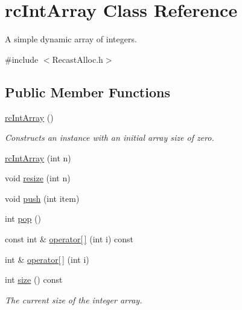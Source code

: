 \hypertarget{classrcIntArray}{}\section{rc\+Int\+Array Class Reference}
\label{classrcIntArray}


A simple dynamic array of integers.  




{\ttfamily \#include $<$Recast\+Alloc.\+h$>$}

\subsection*{Public Member Functions}
\begin{DoxyCompactItemize}
\item 
\mbox{\label{classrcIntArray_a7c2de9614c66762b3083becbdcaf07d4}} 
\hyperlink{classrcIntArray_a7c2de9614c66762b3083becbdcaf07d4}{rc\+Int\+Array} ()
\begin{DoxyCompactList}\small\item\em Constructs an instance with an initial array size of zero. \end{DoxyCompactList}\item 
\hyperlink{classrcIntArray_ae24aed0e0cb7e79fc0a34de088eba93a}{rc\+Int\+Array} (int n)
\item 
void \hyperlink{classrcIntArray_a2135fb43dd504939a2eadbb78650c155}{resize} (int n)
\item 
void \hyperlink{classrcIntArray_ae52f6cd7ffdd2dba00f6f006853dc441}{push} (int item)
\item 
int \hyperlink{classrcIntArray_a25558e84868988dc42bf5b2b3c9c3a84}{pop} ()
\item 
const int \& \hyperlink{classrcIntArray_a27c2d32c068dfe3021e0bc4efc2ca04c}{operator\mbox{[}$\,$\mbox{]}} (int i) const
\item 
int \& \hyperlink{classrcIntArray_a795c1a259ad8ddb6e2f5143fa721a89d}{operator\mbox{[}$\,$\mbox{]}} (int i)
\item 
\mbox{\label{classrcIntArray_af17b8fb439ac8121af044d4f4d13753c}} 
int \hyperlink{classrcIntArray_af17b8fb439ac8121af044d4f4d13753c}{size} () const
\begin{DoxyCompactList}\small\item\em The current size of the integer array. \end{DoxyCompactList}\item 

\end{DoxyCompactItemize}
